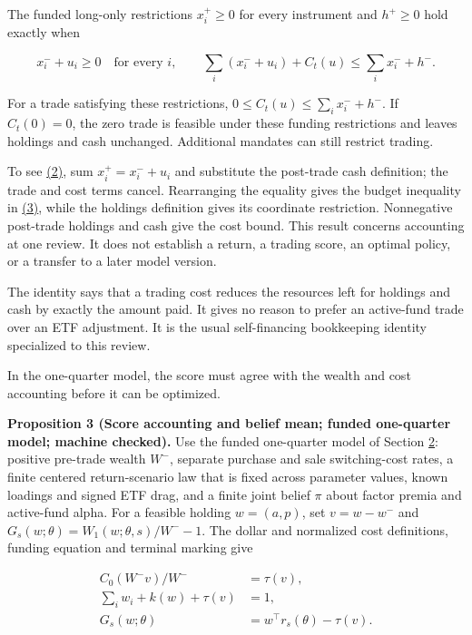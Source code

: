 \documentclass[11pt]{article}
\begin{document}
The funded long-only restrictions \(x_i^+\geq0\) for every instrument and
\(h^+\geq0\) hold exactly when

\begin{equation*}
x_i^-+u_i\geq0\quad\text{for every }i,
\qquad
\sum_i(x_i^-+u_i)+C_t(u)\leq\sum_i x_i^-+h^-. \tag{3}\label{eq:3}
\end{equation*}

For a trade satisfying these restrictions,
\(0\leq C_t(u)\leq\sum_i x_i^-+h^-\). If \(C_t(0)=0\), the zero trade
is feasible under these funding restrictions and leaves holdings and cash unchanged.
Additional mandates can still restrict trading.

To see \hyperref[eq:2]{(2)}, sum \(x_i^+=x_i^-+u_i\) and substitute the post-trade cash
definition; the trade and cost terms cancel. Rearranging the equality gives the
budget inequality in \hyperref[eq:3]{(3)}, while the holdings definition gives its coordinate
restriction. Nonnegative post-trade holdings and cash give the cost bound. This result
concerns accounting at one review. It does not establish a return, a trading score,
an optimal policy, or a transfer to a later model version.

The identity says that a trading cost reduces the resources left for
holdings and cash by exactly the amount paid. It gives no reason to
prefer an active-fund trade over an ETF adjustment. It is the usual
self-financing bookkeeping identity specialized to this review.

In the one-quarter model, the score must agree with the wealth and
cost accounting before it can be optimized.

\label{res:Proposition-3}
\textbf{Proposition 3 (Score accounting and belief mean; funded one-quarter model; machine checked).}
Use the funded one-quarter model of Section \hyperref[sec:2]{2}: positive pre-trade wealth \(W^-\),
separate purchase and sale switching-cost rates, a finite centered return-scenario
law that is fixed across parameter values, known loadings and signed ETF drag,
and a finite joint belief \(\pi\) about factor premia and active-fund alpha.
For a feasible holding \(w=(a,p)\), set \(v=w-w^-\) and
\(G_s(w;\theta)=W_1(w;\theta,s)/W^--1\). The dollar and normalized cost definitions,
funding equation and terminal marking give

\begin{equation*}
\begin{aligned}
C_0(W^-v)/W^- &= \tau(v),\\
\sum_i w_i+k(w)+\tau(v) &= 1,\\
G_s(w;\theta) &= w^\top r_s(\theta)-\tau(v). 
\end{aligned} \tag{4}\label{eq:4}
\end{equation*}
\end{document}
